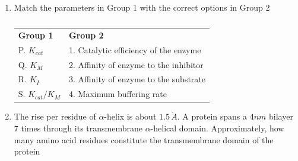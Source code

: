 \documentclass[journal,12pt,onecolumn]{IEEEtran}
\theoremstyle{remark}
\begin{document}
\begin{enumerate}
\begin{enumerate}
\end{enumerate}

\item Match the parameters in Group 1 with the correct options in Group 2 
\hfill{}

\begin{table}[h]
\centering
\begin{tabular}{ll}
\textbf{Group 1} & \textbf{Group 2} \\
P. $K_{cat}$ & 1. Catalytic efficiency of the enzyme \\
Q. $K_M$ & 2. Affinity of enzyme to the inhibitor \\
R. $K_I$ & 3. Affinity of enzyme to the substrate \\
S. $K_{cat}/K_M$ & 4. Maximum buffering rate \\
\end{tabular}
\caption*{}
\label{tab:q16}
\end{table}

\begin{enumerate}
\end{enumerate}

\item The rise per residue of $\alpha$-helix is about $1.5\,\mathring{A}$. A protein spans a $4nm$ bilayer $7$ times through its transmembrane $\alpha$-helical domain. Approximately, how many amino acid residues constitute the transmembrane domain of the protein 
\hfill{}

\begin{enumerate}
\end{enumerate}


\end{enumerate}
\end{document}
